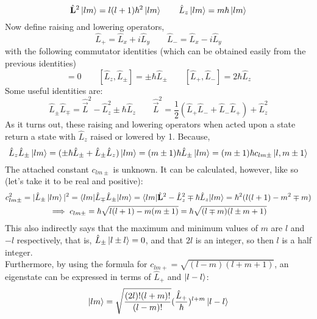 \documentclass{article}
\begin{document}
\begin{equation*}
\hat{\mathbf{L}}^2 \ket{lm} = l(l+1)\hbar^2\ket{lm} \qquad \hat{L}_z \ket{lm} = m\hbar\ket{lm} 
\end{equation*}
Now define raising and lowering operators, \begin{equation*} \hat{L}_+ = \hat{L}_x + i\hat{L}_y \qquad \hat{L}_- = \hat{L}_x - i\hat{L}_y \end{equation*}
with the following commutator identities (which can be obtained easily from the previous identities)
\begin{equation*}
[\hat{\vec{L}}^2, \hat{L}_{\pm}]  = 0 \qquad [\hat{L}_z, \hat{L}_{\pm}] = \pm \hbar \hat{L}_{\pm} \qquad [\hat{L}_+, \hat{L}_-] = 2\hbar\hat{L}_z
\end{equation*}
Some useful identities are:
\begin{equation*}
\hat{L}_{\pm}\hat{L}_{\mp} = \hat{\vec{L}}^2 - \hat{L}_z^2 \pm \hbar\hat{L}_z \qquad \hat{\vec{L}}^2 = \frac{1}{2}(\hat{L}_+\hat{L}_- + \hat{L}_-\hat{L}_+) + \hat{L}_z^2
\end{equation*}
As it turns out, these raising and lowering operators when acted upon a state return a state with $\hat{L}_z$ raised or lowered by 1. Because,
\begin{equation*}
\hat{L}_z \hat{L}_{\pm} \ket{lm} = (\pm\hbar \hat{L}_{\pm} + \hat{L}_{\pm}\hat{L}_z)\ket{lm} = (m\pm  1)\hbar\hat{L}_{\pm}\ket{lm} = (m\pm  1)\hbar c_{lm\pm}\ket{l,m\pm 1}
\end{equation*}
The attached constant $c_{lm\pm}$ is unknown. It can be calculated, however, like so (let's take it to be real and positive):
\begin{gather*}
c_{lm\pm}^2 = |\hat{L}_\pm \ket{lm}|^2 = \braket{lm |\hat{L}_\mp \hat{L}_\pm | lm} = \braket{lm | \hat{\mathbf{L}}^2 - \hat{L}_z^2 \mp \hbar\hat{L}_z | lm} = \hbar^2(l(l+1) - m^2 \mp m) \\
 \implies c_{lm\pm} = \hbar\sqrt{l(l+1) - m(m\pm 1)} = \hbar\sqrt{(l\mp m)(l \pm m + 1)}
\end{gather*}
This also indirectly says that the maximum and minimum values of $m$ are $l$ and $-l$ respectively, that is, $\hat{L}_{\pm} \ket{l \pm l} = 0$, and that $2l$ is an integer, so then $l$ is a half integer. \\
Furthermore, by using the formula for $c_{lm+} = \sqrt{(l-m)(l+m+1)}$, an eigenstate can be expressed in terms of $\hat{L}_+$ and $\ket{l-l}$:
\begin{equation*} \ket{lm} = \sqrt{\frac{(2l)!(l+m)!}{(l-m)!}}(\frac{\hat{L}_+}{\hbar})^{l+m}\ket{l-l}\end{equation*}
\end{document}
